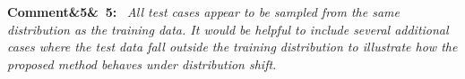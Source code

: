 \documentclass[11pt]{article}
\newenvironment{rcomment}[1]{\par\bigskip\noindent\textbf{Comment\ifx&#1&\else\ #1\fi:}\ \itshape}{\par}
\newenvironment{action}{\par\smallskip\noindent\color{resp}\textbf{Action:}\ }{\par}
\newcommand{\authornote}[1]{\textcolor{note}{\textsf{[Authors: #1]}}}
\newcommand{\tbd}[1]{\textcolor{note}{\textsf{[#1]}}}
\newcommand{\lines}[1]{\tbd{lines #1}}
\begin{document}
%

\begin{rcomment}{5}
All test cases appear to be sampled from the same distribution as the training data. It would be helpful to include several additional cases where the test data fall outside the training distribution to illustrate how the proposed method behaves under distribution shift.
\end{rcomment}
\end{document}
